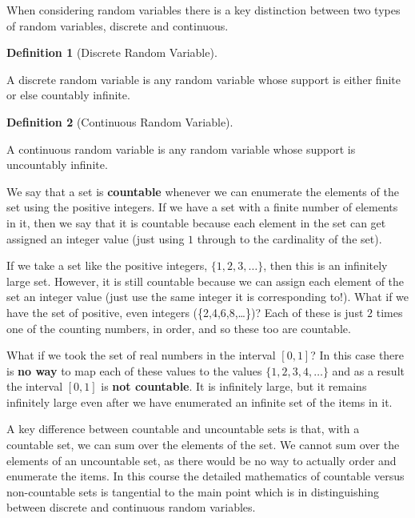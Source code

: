 \documentclass[
  letterpaper,
  DIV=11,
  numbers=noendperiod]{scrreprt}
\theoremstyle{definition}
\theoremstyle{definition}
\theoremstyle{definition}
\newtheorem{definition}{Definition}[chapter]
\theoremstyle{remark}
\begin{document}
When considering random variables there is a key distinction between two
types of random variables, discrete and continuous.

\begin{definition}[Discrete Random
Variable]\protect\hypertarget{def-discrete-random-variable}{}\label{def-discrete-random-variable}

A discrete random variable is any random variable whose support is
either finite or else countably infinite.

\end{definition}

\begin{definition}[Continuous Random
Variable]\protect\hypertarget{def-continuous-random-variable}{}\label{def-continuous-random-variable}

A continuous random variable is any random variable whose support is
uncountably infinite.

\end{definition}

\begin{tcolorbox}[enhanced jigsaw, coltitle=black, colframe=quarto-callout-note-color-frame, colbacktitle=quarto-callout-note-color!10!white, bottomrule=.15mm, opacitybacktitle=0.6, colback=white, toptitle=1mm, arc=.35mm, leftrule=.75mm, bottomtitle=1mm, opacityback=0, breakable, rightrule=.15mm, title={Countable and Uncountable Sets}, left=2mm, titlerule=0mm, toprule=.15mm]

We say that a set is \textbf{countable} whenever we can enumerate the
elements of the set using the positive integers. If we have a set with a
finite number of elements in it, then we say that it is countable
because each element in the set can get assigned an integer value (just
using \(1\) through to the cardinality of the set).

If we take a set like the positive integers, \(\{1,2,3,\dots\}\), then
this is an infinitely large set. However, it is still countable because
we can assign each element of the set an integer value (just use the
same integer it is corresponding to!). What if we have the set of
positive, even integers (\{2,4,6,8,\dots\})? Each of these is just \(2\)
times one of the counting numbers, in order, and so these too are
countable.

What if we took the set of real numbers\footnotemark{} in the interval
\([0,1]\)? In this case there is \textbf{no way} to map each of these
values to the values \(\{1,2,3,4,\dots\}\) and as a result the interval
\([0,1]\) is \textbf{not countable}. It is infinitely large, but it
remains infinitely large even after we have enumerated an infinite set
of the items in it.

A key difference between countable and uncountable sets is that, with a
countable set, we can\footnotemark{} sum over the elements of the set.
We cannot sum over the elements of an uncountable set, as there would be
no way to actually order and enumerate the items. In this course the
detailed mathematics of countable versus non-countable sets is
tangential to the main point which is in distinguishing between discrete
and continuous random variables.

\end{tcolorbox}
\end{document}
